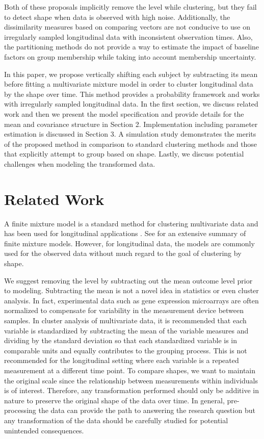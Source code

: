 \documentclass[12pt]{article}
\begin{document}
Both of these proposals implicitly remove the level while clustering, but they fail to detect shape when data is observed with high noise. Additionally, the dissimilarity measures based on comparing vectors are not conducive to use on irregularly sampled longitudinal data with inconsistent observation times. Also, the partitioning methods do not provide a way to estimate the impact of baseline factors on group membership while taking into account membership uncertainty.  

In this paper, we propose vertically shifting each subject by subtracting its mean before fitting a multivariate mixture model in order to cluster longitudinal data by the shape over time. This method provides a probability framework and works with irregularly sampled longitudinal data. In the first section, we discuss related work and then we present the model specification and provide details for the mean and covariance structure in Section 2. Implementation including parameter estimation is discussed in Section 3. A simulation study demonstrates the merits of the proposed method in comparison to standard clustering methods and those that explicitly attempt to group based on shape. Lastly, we discuss potential challenges when modeling the transformed data.

\section{Related Work}
A finite mixture model is a standard method for clustering multivariate data \cite{everitt2009} and has been used for longitudinal applications \cite{muthen2010, jones2001}. See \cite{mclachlan2000} for an extensive summary of finite mixture models. However, for longitudinal data, the models are commonly used for the observed data without much regard to the goal of clustering by shape. 

We suggest removing the level by subtracting out the mean outcome level prior to modeling. Subtracting the mean is not a novel idea in statistics or even cluster analysis. In fact, experimental data such as gene expression microarrays are often normalized to compensate for variability in the measurement device between samples. In cluster analysis of multivariate data, it is recommended that each variable is standardized by subtracting the mean of the variable measures and dividing by the standard deviation so that each standardized variable is in comparable units and equally contributes to the grouping process. This is not recommended for the longitudinal setting where each variable is a repeated measurement at a different time point. To compare shapes, we want to maintain the original scale since the relationship between measurements within individuals is of interest. Therefore, any transformation performed should only be additive in nature to preserve the original shape of the data over time. In general, pre-processing the data can provide the path to answering the research question but any transformation of the data should be carefully studied for potential unintended consequences.
\end{document}
